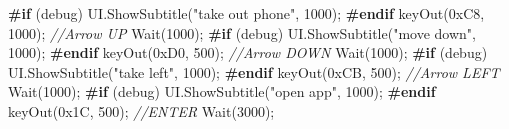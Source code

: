 \documentclass[
  openany]{book}
\newenvironment{Shaded}{\begin{snugshade}}{\end{snugshade}}
\newcommand{\BaseNTok}[1]{\textcolor[rgb]{0.00,0.00,0.81}{#1}}
\newcommand{\CommentTok}[1]{\textcolor[rgb]{0.56,0.35,0.01}{\textit{#1}}}
\newcommand{\DecValTok}[1]{\textcolor[rgb]{0.00,0.00,0.81}{#1}}
\newcommand{\FunctionTok}[1]{\textcolor[rgb]{0.00,0.00,0.00}{#1}}
\newcommand{\KeywordTok}[1]{\textcolor[rgb]{0.13,0.29,0.53}{\textbf{#1}}}
\newcommand{\NormalTok}[1]{#1}
\newcommand{\StringTok}[1]{\textcolor[rgb]{0.31,0.60,0.02}{#1}}
\begin{document}
\begin{Shaded}
\begin{Highlighting}[]
\KeywordTok{#if}\NormalTok{ (debug)}
\NormalTok{                    UI.}\FunctionTok{ShowSubtitle}\NormalTok{(}\StringTok{"take out phone"}\NormalTok{, }\DecValTok{1000}\NormalTok{); }
\KeywordTok{#endif}
                    \FunctionTok{keyOut}\NormalTok{(}\BaseNTok{0xC8}\NormalTok{, }\DecValTok{1000}\NormalTok{); }\CommentTok{//Arrow UP}
                    \FunctionTok{Wait}\NormalTok{(}\DecValTok{1000}\NormalTok{);}
\KeywordTok{#if}\NormalTok{ (debug)}
\NormalTok{                    UI.}\FunctionTok{ShowSubtitle}\NormalTok{(}\StringTok{"move down"}\NormalTok{, }\DecValTok{1000}\NormalTok{);}
\KeywordTok{#endif}
                    \FunctionTok{keyOut}\NormalTok{(}\BaseNTok{0xD0}\NormalTok{, }\DecValTok{500}\NormalTok{); }\CommentTok{//Arrow DOWN}
                    \FunctionTok{Wait}\NormalTok{(}\DecValTok{1000}\NormalTok{);}
\KeywordTok{#if}\NormalTok{ (debug)}
\NormalTok{                    UI.}\FunctionTok{ShowSubtitle}\NormalTok{(}\StringTok{"take left"}\NormalTok{, }\DecValTok{1000}\NormalTok{); }
\KeywordTok{#endif}
                    \FunctionTok{keyOut}\NormalTok{(}\BaseNTok{0xCB}\NormalTok{, }\DecValTok{500}\NormalTok{); }\CommentTok{//Arrow LEFT}
                    \FunctionTok{Wait}\NormalTok{(}\DecValTok{1000}\NormalTok{);}
\KeywordTok{#if}\NormalTok{ (debug)}
\NormalTok{                    UI.}\FunctionTok{ShowSubtitle}\NormalTok{(}\StringTok{"open app"}\NormalTok{, }\DecValTok{1000}\NormalTok{);}
\KeywordTok{#endif}
                    \FunctionTok{keyOut}\NormalTok{(}\BaseNTok{0x1C}\NormalTok{, }\DecValTok{500}\NormalTok{); }\CommentTok{//ENTER}
                    \FunctionTok{Wait}\NormalTok{(}\DecValTok{3000}\NormalTok{);}


\end{Highlighting}
\end{Shaded}
\end{document}
